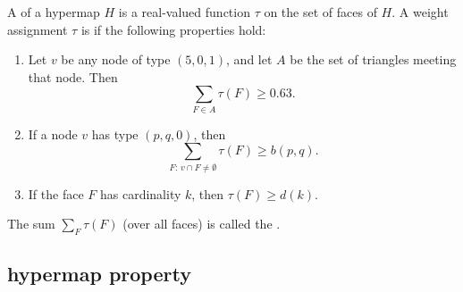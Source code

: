 \begin{definition}
%
  A  of a hypermap $H$ is a real-valued
  function $\tau$ on the set of faces of $H$. A weight assignment
  $\tau$ is  if the following properties hold:
%
%
%
%
%
%
\begin{enumerate}
\item {} 
Let $v$ be any node of type $(5,0,1)$, and let
  $A$ be the set of triangles meeting that node.  Then
\[ \sum_{F\in A} \tau(F)
\ge  0.63.\] 
\item {}
 If a node $v$ has type $(p,q,0)$, then
  \[ \sum_{F:\,v\cap F\ne\emptyset} \tau(F) \ge
    b(p,q).\] 
\item {}
 If the face $F$ has cardinality $k$, then
$\tau(F) \ge d(k)$.
\end{enumerate}
%
%

The sum $\sum_F \tau(F)$ (over all faces) is called the . 
%
\end{definition}





\subsection{hypermap property}
\label{sec:graphproperty}


